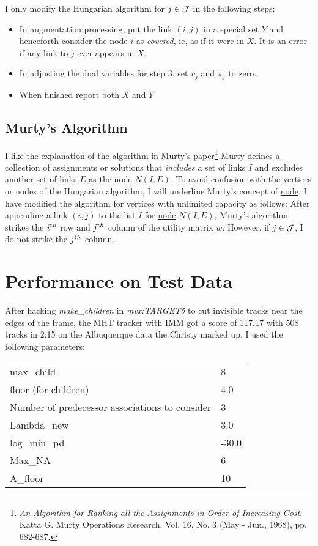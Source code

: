 \documentclass[11pt]{article}
\begin{document}
I only modify the Hungarian algorithm for $j\in {\cal J}$ in the
following steps:
\begin{itemize}
\item In augmentation processing, put the link $(i,j)$ in a special
  set $Y$ and henceforth consider the node $i$ as \emph{covered}, ie,
  as if it were in $X$.  It is an error if any link to $j$ ever
  appears in $X$.
\item In adjusting the dual variables for step 3, set $v_j$ and
  $\pi_j$ to zero.
\item When finished report both $X$ and $Y$
\end{itemize}

\subsection{Murty's Algorithm}
\label{sec:murty}

I like the explanation of the algorithm in Murty's
paper\footnote{\emph{An Algorithm for Ranking all the Assignments in
    Order of Increasing Cost}, Katta G.  Murty Operations Research,
  Vol. 16, No. 3 (May - Jun., 1968), pp.  682-687.}  Murty defines a
collection of assignments or solutions that \emph{includes} a set of
links $I$ and excludes another set of links $E$ as the
\underline{node} $N(I,E)$.  To avoid confusion with the vertices or
nodes of the Hungarian algorithm, I will underline Murty's concept of
\underline{node}.  I have modified the algorithm for vertices with
unlimited capacity as follows: After appending a link $(i,j)$ to the
list $I$ for \underline{node} $N(I,E)$, Murty's algorithm strikes the
$i^{\text th}$ row and $j^{\text th}$ column of the utility matrix
$w$.  However, if $j\in {\cal J}$, I do not strike the $j^{\text th}$
column.

\section{Performance on Test Data}
\label{sec:tests}

After hacking \emph{make\_children} in \emph{mvx:TARGET5} to cut
invisible tracks near the edges of the frame, the MHT tracker with IMM
got a score of 117.17 with 508 tracks in 2:15 on the Albuquerque data
the Christy marked up.  I used the following parameters:
\begin{center}
  \begin{tabular}[]{ll}
    max\_child & 8 \\
    floor (for children) & 4.0 \\
    Number of predecessor associations to consider & 3 \\
    Lambda\_new & 3.0 \\
    log\_min\_pd & -30.0 \\
    Max\_NA & 6 \\
    A\_floor & 10
  \end{tabular}
\end{center}
\end{document}

